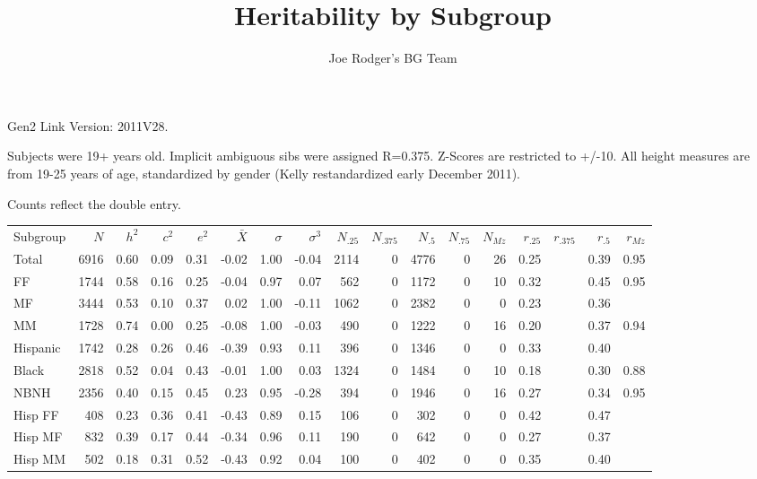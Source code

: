\documentclass[a4paper]{article}
\title{Heritability by Subgroup}
\author{Joe Rodger's BG Team}
\begin{document}
\maketitle
Gen2 Link Version: 2011V28.


Subjects were 19+ years old.  Implicit ambiguous sibs were assigned R=0.375. Z-Scores are restricted to  +/-10.  All height measures are from 19-25 years of age, standardized by gender (Kelly restandardized early December 2011).

Counts reflect the double entry.
\begin{table}[ht]
\begin{center}
\begin{tabular}{lr|rrr|rrr|rrrrr|rrrr}
 Subgroup & $N$ & $h^2$ & $c^2$ & $e^2$ & $\bar{X}$ & $\sigma$ & $\sigma^3$ & $N_{.25}$ & $N_{.375}$ & $N_{.5}$ & $N_{.75}$ & $N_{Mz}$ & $r_{.25}$ & $r_{.375}$ & $r_{.5}$ & $r_{Mz}$ \\ 
 Total & 6916 & 0.60 & 0.09 & 0.31 & -0.02 & 1.00 & -0.04 & 2114 & 0 & 4776 & 0 & 26 & 0.25 &  & 0.39 & 0.95 \\ 
   \hline
FF & 1744 & 0.58 & 0.16 & 0.25 & -0.04 & 0.97 & 0.07 & 562 & 0 & 1172 & 0 & 10 & 0.32 &  & 0.45 & 0.95 \\ 
  MF & 3444 & 0.53 & 0.10 & 0.37 & 0.02 & 1.00 & -0.11 & 1062 & 0 & 2382 & 0 & 0 & 0.23 &  & 0.36 &  \\ 
  MM & 1728 & 0.74 & 0.00 & 0.25 & -0.08 & 1.00 & -0.03 & 490 & 0 & 1222 & 0 & 16 & 0.20 &  & 0.37 & 0.94 \\ 
   \hline
Hispanic & 1742 & 0.28 & 0.26 & 0.46 & -0.39 & 0.93 & 0.11 & 396 & 0 & 1346 & 0 & 0 & 0.33 &  & 0.40 &  \\ 
  Black & 2818 & 0.52 & 0.04 & 0.43 & -0.01 & 1.00 & 0.03 & 1324 & 0 & 1484 & 0 & 10 & 0.18 &  & 0.30 & 0.88 \\ 
  NBNH & 2356 & 0.40 & 0.15 & 0.45 & 0.23 & 0.95 & -0.28 & 394 & 0 & 1946 & 0 & 16 & 0.27 &  & 0.34 & 0.95 \\ 
   \hline
Hisp FF & 408 & 0.23 & 0.36 & 0.41 & -0.43 & 0.89 & 0.15 & 106 & 0 & 302 & 0 & 0 & 0.42 &  & 0.47 &  \\ 
  Hisp MF & 832 & 0.39 & 0.17 & 0.44 & -0.34 & 0.96 & 0.11 & 190 & 0 & 642 & 0 & 0 & 0.27 &  & 0.37 &  \\ 
  Hisp MM & 502 & 0.18 & 0.31 & 0.52 & -0.43 & 0.92 & 0.04 & 100 & 0 & 402 & 0 & 0 & 0.35 &  & 0.40 &  \\ 

\end{tabular}
\end{center}
\end{table}
\end{document}
